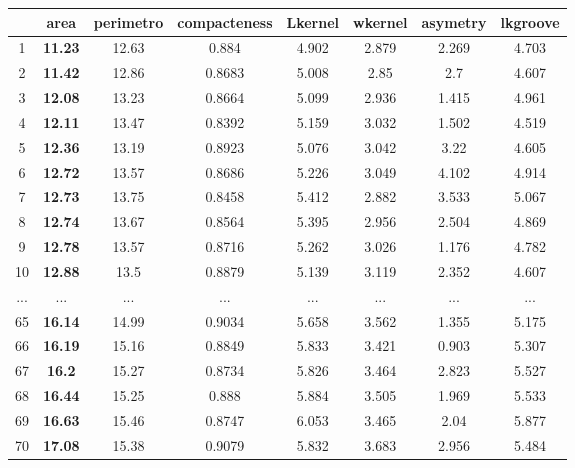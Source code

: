 \begin{table}[!ht]
{\begin{tabular}{|c|c|c|c|c|c|c|c|}
& \textbf{area} & perimetro & compacteness & Lkernel & wkernel & asymetry &lkgroove \\ \hline
\rowcolor[HTML]{EFEFEF} 
1 & \textbf{11.23} & 12.63 & 0.884 & 4.902 & 2.879 & 2.269 & 4.703\\ \hline 
\rowcolor[HTML]{EFEFEF}
2 & \textbf{11.42} & 12.86 & 0.8683 & 5.008 & 2.85 & 2.7 & 4.607\\ \hline 
\rowcolor[HTML]{EFEFEF}
3 & \textbf{12.08} & 13.23 & 0.8664 & 5.099 & 2.936 & 1.415 & 4.961\\ \hline 
\rowcolor[HTML]{EFEFEF}
4 & \textbf{12.11} & 13.47 & 0.8392 & 5.159 & 3.032 & 1.502 & 4.519\\ \hline 
\rowcolor[HTML]{EFEFEF}
5 & \textbf{12.36} & 13.19 & 0.8923 & 5.076 & 3.042 & 3.22 & 4.605\\ \hline 
\rowcolor[HTML]{EFEFEF}
6 & \textbf{12.72} & 13.57 & 0.8686 & 5.226 & 3.049 & 4.102 & 4.914\\ \hline 
\rowcolor[HTML]{EFEFEF}
7 & \textbf{12.73} & 13.75 & 0.8458 & 5.412 & 2.882 & 3.533 & 5.067\\ \hline 
\rowcolor[HTML]{EFEFEF}
8 & \textbf{12.74} & 13.67 & 0.8564 & 5.395 & 2.956 & 2.504 & 4.869\\ \hline 
\rowcolor[HTML]{EFEFEF}
9 & \textbf{12.78} & 13.57 & 0.8716 & 5.262 & 3.026 & 1.176 & 4.782\\ \hline 
10 & \textbf{12.88} & 13.5 & 0.8879 & 5.139 & 3.119 & 2.352 & 4.607\\ \hline 
... & ... & ... & ... & ... & ... & ... & ...\\ \hline 
65 & \textbf{16.14} & 14.99 & 0.9034 & 5.658 & 3.562 & 1.355 & 5.175\\ \hline 
\rowcolor[HTML]{EFEFEF}
66 & \textbf{16.19} & 15.16 & 0.8849 & 5.833 & 3.421 & 0.903 & 5.307\\ \hline 
\rowcolor[HTML]{EFEFEF}
67 & \textbf{16.2} & 15.27 & 0.8734 & 5.826 & 3.464 & 2.823 & 5.527\\ \hline 
\rowcolor[HTML]{EFEFEF}
68 & \textbf{16.44} & 15.25 & 0.888 & 5.884 & 3.505 & 1.969 & 5.533\\ \hline 
\rowcolor[HTML]{EFEFEF}
69 & \textbf{16.63} & 15.46 & 0.8747 & 6.053 & 3.465 & 2.04 & 5.877\\ \hline 
\rowcolor[HTML]{EFEFEF}
70 & \textbf{17.08} & 15.38 & 0.9079 & 5.832 & 3.683 & 2.956 & 5.484\\ \hline  

\end{tabular}
    }
 \hspace{1cm}
   \subfloat[Amostra de dados ordenados em relação ao atributo \textbf{perimetro}  simulando os registros do cluster 1]{ \label{tab:analise:seeds:cluster1:cart}
   \small\addtolength{\tabcolsep}{-2pt}
   \begin{tabular}{|c|c|c|c|c|c|c|c|}
\hline


\end{tabular}}
\end{table}
